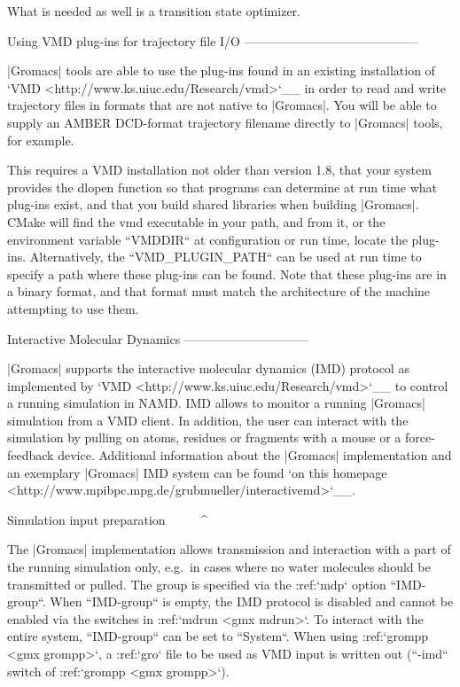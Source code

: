 What is needed as well is a transition state optimizer.

Using VMD plug-ins for trajectory file I/O
------------------------------------------

|Gromacs|
tools are able to use the plug-ins found in an existing installation of
`VMD <http://www.ks.uiuc.edu/Research/vmd>`__ in order to read and write
trajectory files in formats that are not native to |Gromacs|. You will be
able to supply an AMBER DCD-format trajectory filename directly to
|Gromacs| tools, for example.

This requires a VMD installation not older than version 1.8, that your
system provides the dlopen function so that programs can determine at
run time what plug-ins exist, and that you build shared libraries when
building |Gromacs|. CMake will find the vmd executable in your path, and
from it, or the environment variable ``VMDDIR`` at
configuration or run time, locate the plug-ins. Alternatively, the
``VMD_PLUGIN_PATH`` can be used at run time to specify a
path where these plug-ins can be found. Note that these plug-ins are in
a binary format, and that format must match the architecture of the
machine attempting to use them.

Interactive Molecular Dynamics
------------------------------

|Gromacs| supports the interactive molecular dynamics (IMD) protocol as
implemented by `VMD <http://www.ks.uiuc.edu/Research/vmd>`__ to control
a running simulation in NAMD. IMD allows to monitor a running |Gromacs|
simulation from a VMD client. In addition, the user can interact with
the simulation by pulling on atoms, residues or fragments with a mouse
or a force-feedback device. Additional information about the |Gromacs|
implementation and an exemplary |Gromacs| IMD system can be found `on this
homepage <http://www.mpibpc.mpg.de/grubmueller/interactivemd>`__.

Simulation input preparation
^^^^^^^^^^^^^^^^^^^^^^^^^^^^

The |Gromacs| implementation allows transmission and interaction with a
part of the running simulation only, e.g. in cases where no water
molecules should be transmitted or pulled. The group is specified via
the :ref:`mdp` option ``IMD-group``. When
``IMD-group`` is empty, the IMD protocol is disabled and
cannot be enabled via the switches in :ref:`mdrun <gmx mdrun>`. To interact
with the entire system, ``IMD-group`` can be set to
``System``. When using :ref:`grompp <gmx grompp>`, a
:ref:`gro` file to be used as VMD input is written out
(``-imd`` switch of :ref:`grompp <gmx grompp>`).

